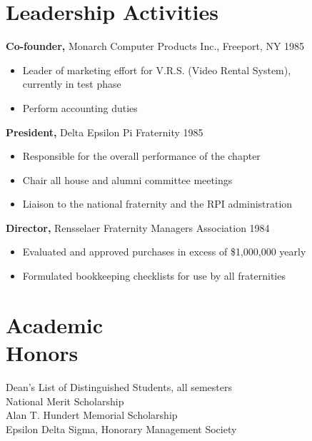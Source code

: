 \begin{resume}
\begin{itemize}
		 \end{itemize}

\section{Leadership   Activities} 
               {\bf Co-founder,} Monarch Computer Products Inc., Freeport, NY    \hfill         1985 
                \begin{itemize} \itemsep -2pt
              \item Leader of marketing effort for V.R.S. (Video 
                 Rental System), \\
                  currently in test phase 
                 
                \item  Perform accounting duties 

		 \end{itemize}

		{\bf President,} Delta Epsilon Pi Fraternity \hfill   1985 
                \begin{itemize} \itemsep -2pt
                 \item  Responsible for the overall performance of the 
                 chapter 
                
                 \item Chair all house and alumni committee meetings 
                
                 \item Liaison to the national fraternity and the RPI 
                 administration 
		 \end{itemize}

                  {\bf  Director,}  Rensselaer Fraternity Managers 
              Association     \hfill                                 1984 
                 \begin{itemize} \itemsep -2pt

               \item    Evaluated and approved purchases in excess of 
                 {\$}1,000,000 yearly 
                 
               \item  Formulated bookkeeping checklists for use by all 
                 fraternities 
		 \end{itemize}

\section{Academic \\ Honors} 
Dean's List of Distinguished Students, all semesters \\
National Merit Scholarship \\
Alan T. Hundert Memorial Scholarship \\
 Epsilon Delta Sigma, Honorary Management Society 
 


\end{resume}
